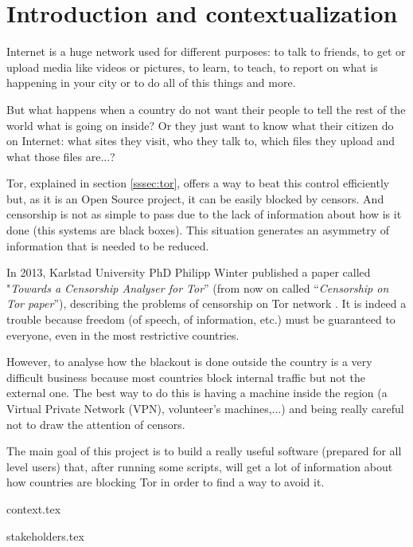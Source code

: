 \section{Introduction and contextualization}
\label{sec:introduction}

Internet is a huge network used for different purposes: to talk to friends, to get or upload media like videos or pictures, to learn, to teach, to report on what is happening in your city or to do all of this things and more. 

But what happens when a country do not want their people to tell the rest of the world what is going on inside? Or they just want to know what their citizen do on Internet: what sites they visit, who they talk to, which files they upload and what those files are...?

Tor, explained in section \ref{sssec:tor}, offers a way to beat this control efficiently but, as it is an Open Source project, it can be easily blocked by censors. And censorship is not as simple to pass due to the lack of information about how is it done (this systems are black boxes). This situation generates an asymmetry of information that is needed to be reduced.

In 2013, Karlstad University PhD Philipp Winter published a paper called "\textit{Towards a Censorship Analyser for Tor}” (from now on called “\textit{Censorship on Tor paper}”), describing the problems of censorship on Tor network \cite{TorPaper}. It is indeed a trouble because freedom (of speech, of information, etc.) must be guaranteed to everyone, even in the most restrictive countries.

\pagebreak
However, to analyse how the blackout is done outside the country is a very difficult business because most countries block internal traffic but not the external one. The best way to do this is having a machine inside the region (a Virtual Private Network (VPN), volunteer's machines,...) and being really careful not to draw the attention of censors.

The main goal of this project is to build a really useful software (prepared for all level users) that, after running some scripts, will get a lot of information about how countries are blocking Tor in order to find a way to avoid it.

{context.tex}

\pagebreak
{stakeholders.tex}
